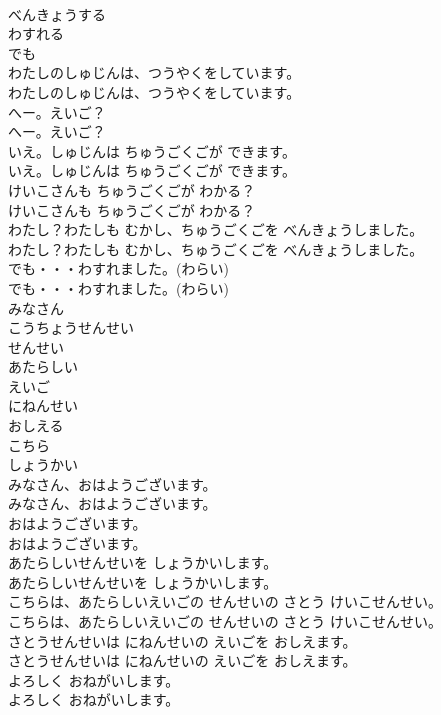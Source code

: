 \documentclass[8pt]{extreport}
\begin{document}
\begin{CJK}{UTF8}{min}
\\	べんきょうする
\\	わすれる
\\	でも
\\	わたしのしゅじんは、つうやくをしています。
\\	わたしのしゅじんは、つうやくをしています。
\\	へー。えいご？
\\	へー。えいご？
\\	いえ。しゅじんは ちゅうごくごが できます。　
\\	いえ。しゅじんは ちゅうごくごが できます。　
\\	けいこさんも ちゅうごくごが わかる？
\\	けいこさんも ちゅうごくごが わかる？
\\	わたし？わたしも むかし、ちゅうごくごを べんきょうしました。
\\	わたし？わたしも むかし、ちゅうごくごを べんきょうしました。
\\	でも・・・わすれました。(わらい)
\\	でも・・・わすれました。(わらい)
\\	みなさん
\\	こうちょうせんせい
\\	せんせい
\\	あたらしい
\\	えいご
\\	にねんせい
\\	おしえる
\\	こちら
\\	しょうかい
\\	みなさん、おはようございます。
\\	みなさん、おはようございます。
\\	おはようございます。
\\	おはようございます。
\\	あたらしいせんせいを  しょうかいします。
\\	あたらしいせんせいを  しょうかいします。
\\	こちらは、あたらしいえいごの せんせいの さとう けいこせんせい。
\\	こちらは、あたらしいえいごの せんせいの さとう けいこせんせい。
\\	さとうせんせいは にねんせいの えいごを おしえます。
\\	さとうせんせいは にねんせいの えいごを おしえます。
\\	よろしく おねがいします。
\\	よろしく おねがいします。

\end{CJK}
\end{document}
